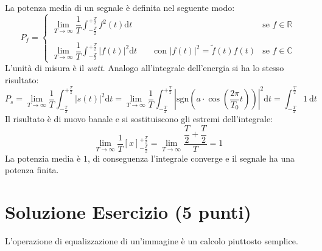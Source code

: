 \documentclass[a4paper]{article}
\begin{document}
	\noindent
	La potenza media di un segnale è definita nel seguente modo:
	\begin{equation*}
		P_{f} = \begin{cases}
			\displaystyle\lim_{T\rightarrow\infty} \dfrac{1}{T} \displaystyle\int_{-\frac{T}{2}}^{+\frac{T}{2}} f^{2}\left(t\right)\mathrm{d}t & \text{se } f \in \mathbb{R} \\
			\\
			\displaystyle\lim_{T\rightarrow\infty} \dfrac{1}{T} \displaystyle\int_{-\frac{T}{2}}^{+\frac{T}{2}} \left|f\left(t\right)\right|^{2}\mathrm{d}t \hspace{2em} \text{con } \left|f\left(t\right)\right|^{2} = \tilde{f}\left(t\right)f\left(t\right) & \text{se } f \in \mathbb{C}
		\end{cases}
	\end{equation*}
	L'unità di misura è il \emph{watt}.	Analogo all'integrale dell'energia si ha lo stesso risultato:
	\begin{equation*}
		P_{s} = \displaystyle\lim_{T\rightarrow\infty} \dfrac{1}{T} \displaystyle\int_{-\frac{T}{2}}^{+\frac{T}{2}} \left|s\left(t\right)\right|^{2}\mathrm{d}t = 
		\displaystyle\lim_{T\rightarrow\infty} \dfrac{1}{T} \displaystyle\int_{-\frac{T}{2}}^{+\frac{T}{2}} \left| \mathrm{sgn}\left(a \cdot \cos\left(\dfrac{2\pi}{T_{0}}t\right)\right) \right|^{2}\mathrm{d}t = \displaystyle\int_{-\frac{T}{2}}^{\frac{T}{2}} 1 \:\mathrm{d}t
	\end{equation*}
	Il risultato è di nuovo banale e si sostituiscono gli estremi dell'integrale:
	\begin{equation*}
		\displaystyle\lim_{T \rightarrow \infty} \dfrac{1}{T}\left[x\right]_{-\frac{T}{2}}^{+\frac{T}{2}} =
		\displaystyle\lim_{T \rightarrow \infty} \dfrac{\dfrac{T}{2} + \dfrac{T}{2}}{T} = 1
	\end{equation*}
	La potenzia media è $1$, di conseguenza l'integrale converge e il segnale ha una potenza finita.\newpage
	
	\section{Soluzione Esercizio (5 punti)}
	
	L'operazione di equalizzazione di un'immagine è un calcolo piuttosto semplice.\newline
	
\end{document}
